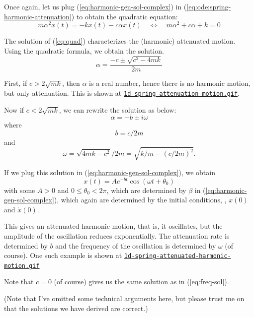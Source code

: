 \documentclass{article}
\begin{document}
Once again,
let us plug (\ref{eq:harmonic-gen-sol-complex}) in (\ref{eq:ode:spring-harmonic-attenuation})
to obtain
the quadratic equation:
\begin{equation}
\label{eq:quad}
m \alpha^2 x(t) = -k x(t) - c \alpha x(t)
\quad
\Leftrightarrow
\quad
m \alpha^2 + c \alpha + k = 0
\end{equation}

The solution of (\ref{eq:quad}) characterizes the (harmonic) attenuated motion. Using the quadratic formula,
we obtain the solution.
\[
\alpha = \frac
{-c \pm \sqrt{c^2 - 4mk}}
{2m}
\]

First, if $c > 2\sqrt{mk}$, then $\alpha$ is a real number,
hence there is no harmonic motion, but only attenuation. This is shown at
{\tt \href{https://github.com/sungheeyun/science/blob/main/animations/1d-spring-attenuation-motion.gif}{1d-spring-attenuation-motion.gif}}.

Now if $c<2 \sqrt{mk}$, we can rewrite the solution as below:
\[
\alpha =
-b
\pm
i \omega
\]
where
\begin{equation}
\label{eq:attenuation-coefficient}
b= {c}/ {2m}
\end{equation}
and
\begin{equation}
\label{eq:angular-frequency}
\omega
= {\sqrt{4mk-c^2}}/ {2m}
= \sqrt{k/m - (c/2m)^2}.
\end{equation}

If we plug this solution in (\ref{eq:harmonic-gen-sol-complex}),
we obtain
\begin{equation}
	x(t) =  A e^{-bt} \cos(\omega t + \theta_0)
\end{equation}
with some $A>0$ and $0\leq \theta_0 < 2\pi$,
which are determined by $\beta$ in (\ref{eq:harmonic-gen-sol-complex}),
which again are determined by the initial conditions,
\ie,
$x(0)$ and $\dot{x}(0)$.

This gives an attenuated harmonic motion,
that is,
it oscillates, but the amplitude of the oscillation reduces exponentially.
The attenuation rate is determined by $b$
and the frequency of the oscillation is determined by $\omega$ (of course).
One such example is shown at
{\tt \href{https://github.com/sungheeyun/science/blob/main/animations/1d-spring-attenuated-harmonic-motion.gif}{1d-spring-attenuated-harmonic-motion.gif}}

Note that $c=0$ (of course) gives us the same solution as in (\ref{eq:freq-sol}).

(Note that I've omitted some technical arguments here, but please trust me on that
the solutions we have derived are correct.)
\end{document}
